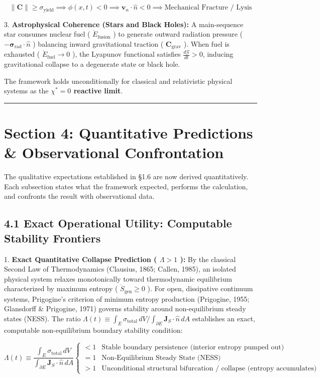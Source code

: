 \documentclass[11pt,a4paper]{article}
\theoremstyle{definition}\newtheorem{definition}{Definition}
\theoremstyle{remark}\newtheorem{remark}{Remark}
\begin{document}
\begin{equation}
\|\mathbf{C}\| \ge \sigma_{\text{yield}} \implies \phi(x, t) < 0 \implies \mathbf{v}_n \cdot \hat{n} < 0 \implies \text{Mechanical Fracture / Lysis}
\end{equation}


3. \textbf{Astrophysical Coherence (Stars and Black Holes):}
A main-sequence star consumes nuclear fuel ( $\dot{E}_{\text{fusion}}$ ) to generate outward radiation pressure ( $-\boldsymbol{\sigma}_{\text{rad}}\cdot\hat{n}$ ) balancing inward gravitational traction ( $\mathbf{C}_{\text{grav}}$ ). When fuel is exhausted ( $\dot{E}_{\text{fuel}} \to 0$ ), the Lyapunov functional satisfies $\frac{d\mathcal{G}}{dt} > 0$, inducing gravitational collapse to a degenerate state or black hole.

The framework holds unconditionally for classical and relativistic physical systems as the \textbf{$\chi^* = 0$ reactive limit}.

\noindent\rule{\linewidth}{0.4pt}
\section{Section 4: Quantitative Predictions \& Observational Confrontation}

The qualitative expectations established in §1.6 are now derived quantitatively. Each subsection states what the framework expected, performs the calculation, and confronts the result with observational data.
\subsection{4.1 Exact Operational Utility: Computable Stability Frontiers}


1. \textbf{Exact Quantitative Collapse Prediction ( $\Lambda > 1$ ):}
By the classical Second Law of Thermodynamics (Clausius, 1865; Callen, 1985), an isolated physical system relaxes monotonically toward thermodynamic equilibrium characterized by maximum entropy ( $\dot{S}_{\text{gen}} \ge 0$ ). For open, dissipative continuum systems, Prigogine's criterion of minimum entropy production (Prigogine, 1955; Glansdorff \& Prigogine, 1971) governs stability around non-equilibrium steady states (NESS). The ratio $\Lambda(t) \equiv \int_E \sigma_{\text{total}} \, dV / \int_{\partial E} \mathbf{J}_S \cdot \hat{n} \, dA$ establishes an exact, computable non-equilibrium boundary stability condition:


\begin{equation}
\Lambda(t) \equiv \frac{\int_E \sigma_{\text{total}} \, dV}{\int_{\partial E} \mathbf{J}_S \cdot \hat{n} \, dA} \begin{cases} < 1 & \text{Stable boundary persistence (interior entropy pumped out)} \\ = 1 & \text{Non-Equilibrium Steady State (NESS)} \\ > 1 & \text{Unconditional structural bifurcation / collapse (entropy accumulates)} \end{cases}
\end{equation}
\end{document}
